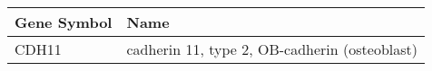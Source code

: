 \begin{tabular}{ll}
\toprule
Gene Symbol &                                          Name \\
\midrule
      CDH11 & cadherin 11, type 2, OB-cadherin (osteoblast) \\
\bottomrule
\end{tabular}
